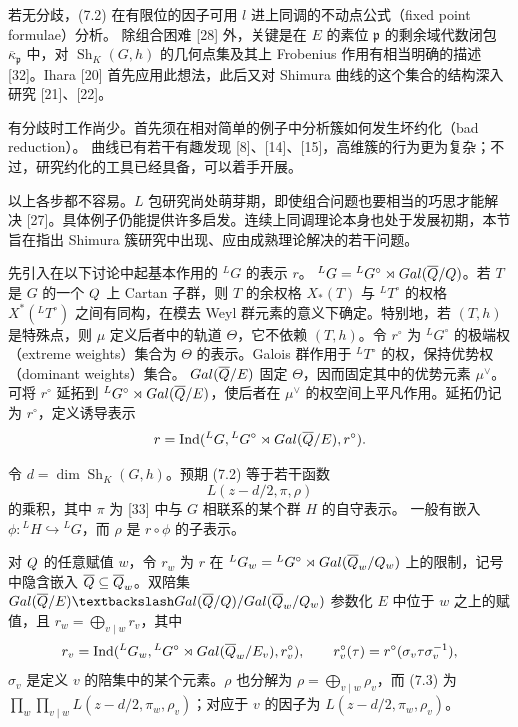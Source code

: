 若无分歧，(7.2) 在有限位的因子可用 $l$ 进上同调的不动点公式（fixed point formulae）分析。
除组合困难 [28] 外，关键是在 $E$ 的素位 $\mathfrak p$ 的剩余域代数闭包
$\overline\kappa_{\mathfrak p}$ 中，对 $\operatorname{Sh}_K(G,h)$ 的几何点集及其上 Frobenius 作用有相当明确的描述
[32]。Ihara [20] 首先应用此想法，此后又对 Shimura 曲线的这个集合的结构深入研究
[21]、[22]。

有分歧时工作尚少。首先须在相对简单的例子中分析簇如何发生坏约化（bad reduction）。
曲线已有若干有趣发现 [8]、[14]、[15]，高维簇的行为更为复杂；不过，研究约化的工具已经具备，可以着手开展。

以上各步都不容易。$L$ 包研究尚处萌芽期，即使组合问题也要相当的巧思才能解决
[27]。具体例子仍能提供许多启发。连续上同调理论本身也处于发展初期，本节旨在指出
Shimura 簇研究中出现、应由成熟理论解决的若干问题。

先引入在以下讨论中起基本作用的 ${}^LG$ 的表示 $r$。
${}^LG={}^LG^\circ\rtimes Gal(\overline{Q}/Q)$。若 $T$ 是 $G$ 的一个 $Q$ 上 Cartan 子群，则
$T$ 的余权格 $X_*(T)$ 与 ${}^LT^\circ$ 的权格 $X^*({}^LT^\circ)$ 之间有同构，在模去
Weyl 群元素的意义下确定。特别地，若 $(T,h)$ 是特殊点，则 $\mu$ 定义后者中的轨道
$\Theta$，它不依赖 $(T,h)$。令 $r^\circ$ 为 ${}^LG^\circ$ 的极端权（extreme weights）集合为
$\Theta$ 的表示。Galois 群作用于 ${}^LT^\circ$ 的权，保持优势权（dominant weights）集合。
$Gal(\overline{Q}/E)$ 固定 $\Theta$，因而固定其中的优势元素 $\mu^\vee$。
可将 $r^\circ$ 延拓到 ${}^LG^\circ\rtimes Gal(\overline{Q}/E)$，使后者在
$\mu^\vee$ 的权空间上平凡作用。延拓仍记为 $r^\circ$，定义诱导表示
\[
r=\operatorname{Ind}({}^LG,{}^LG^\circ\rtimes Gal(\overline{Q}/E),r^\circ).
\]

令 $d=\dim\operatorname{Sh}_K(G,h)$。预期 (7.2) 等于若干函数
\begin{equation}L(z-d/2,\pi,\rho)\tag{7.3}\end{equation}
的乘积，其中 $\pi$ 为 [33] 中与 $G$ 相联系的某个群 $H$ 的自守表示。
一般有嵌入 $\phi:{}^LH\hookrightarrow{}^LG$，而 $\rho$ 是 $r\circ\phi$ 的子表示。

对 $Q$ 的任意赋值 $w$，令 $r_w$ 为 $r$ 在
${}^LG_w={}^LG^\circ\rtimes Gal(\overline{Q}_w/Q_w)$ 上的限制，记号中隐含嵌入
$\overline{Q}\subseteq\overline{Q}_w$。双陪集
$\Gal(\overline\Q/E)\backslash\Gal(\overline\Q/\Q)/\Gal(\overline\Q_w/\Q_w)$
参数化 $E$ 中位于 $w$ 之上的赋值，且 $r_w=\bigoplus_{v\mid w}r_v$，其中
\[
r_v=\operatorname{Ind}({}^LG_w,{}^LG^\circ\rtimes Gal(\overline{Q}_w/E_v),r_v^\circ),
\qquad r_v^\circ(\tau)=r^\circ(\sigma_v\tau\sigma_v^{-1}),
\]
$\sigma_v$ 是定义 $v$ 的陪集中的某个元素。$\rho$ 也分解为
$\rho=\bigoplus_{v\mid w}\rho_v$，而 (7.3) 为
$\prod_w\prod_{v\mid w}L(z-d/2,\pi_w,\rho_v)$；对应于 $v$ 的因子为
$L(z-d/2,\pi_w,\rho_v)$。

